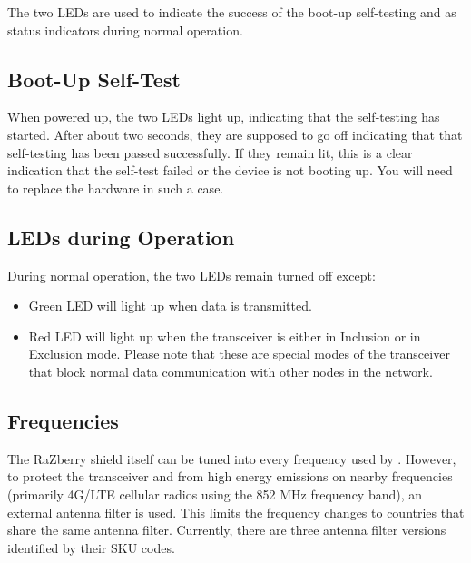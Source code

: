 The two LEDs are used to indicate the success of the boot-up self-testing and as status 
indicators during normal operation.

\subsection{Boot-Up Self-Test}

When powered up, the two LEDs light up, indicating that the self-testing has started. 
After about two seconds, they are supposed to go off indicating that that self-testing 
has been passed successfully. If they remain lit, this is a clear indication that the 
self-test failed or the device is not booting up. You will need to replace the hardware 
in such a case.

\subsection{LEDs during Operation}

During normal operation, the two LEDs remain turned off except:

\begin{itemize}
\item Green LED will light up when data is transmitted.
\item Red LED will light up when the \zwave transceiver is either in Inclusion or in 
Exclusion mode. Please note that these are special modes of the transceiver that block 
normal data communication with other nodes in the network.
\end{itemize}

\subsection{Frequencies}

The RaZberry shield itself can be tuned into every frequency used by \zwave. However, 
to protect the transceiver and \zwave from high energy emissions on nearby frequencies 
(primarily 4G/LTE cellular radios using the 852 MHz frequency band), an external 
antenna filter is used. This limits the frequency changes to countries that share 
the same antenna filter. Currently, there are three antenna filter versions 
identified by their SKU codes.


